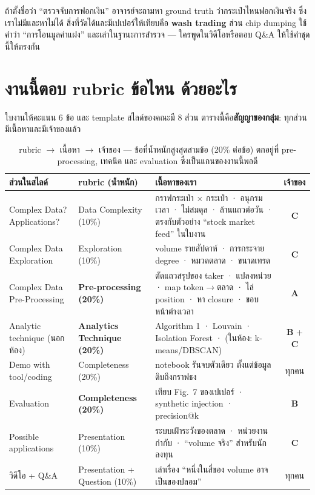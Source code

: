 \documentclass[11pt,a4paper]{article}
\newcommand{\sansall}{\sffamily}
\newcommand{\en}[1]{#1}
\newcommand{\stg}[2]{\textcolor{#1}{\textbf{\en{#2}}}}
\newcommand{\rA}{\stg{accent}{A}}
\newcommand{\rB}{\stg{alg}{B}}
\newcommand{\rC}{\stg{ext}{C}}
\newcommand{\thd}[1]{\sansall\bfseries #1}
\begin{document}
\begin{warnbox}[title={ทำไมชื่อหัวข้อไม่ใช้คำว่า ``ฟอกเงิน'' ตรง ๆ}]
ถ้าตั้งชื่อว่า ``ตรวจจับการฟอกเงิน'' อาจารย์จะถามหา ground truth ว่ากระเป๋าไหนฟอกเงินจริง
ซึ่งเราไม่มีและหาไม่ได้ สิ่งที่วัดได้และมีเปเปอร์ให้เทียบคือ \textbf{wash trading}
ส่วน chip dumping ใช้คำว่า ``การโอนมูลค่าแฝง'' และเล่าในฐานะการสำรวจ
--- ใครพูดในวิดีโอหรือตอบ Q\&A ให้ใช้คำชุดนี้ให้ตรงกัน
\end{warnbox}

\section{งานนี้ตอบ rubric ข้อไหน ด้วยอะไร}

ใบงานให้คะแนน 6 ข้อ และ template สไลด์ของคณะมี 8 ส่วน
ตารางนี้คือ\textbf{สัญญาของกลุ่ม}: ทุกส่วนมีเนื้อหาและมีเจ้าของแล้ว

\begin{table}[H]
\centering\small
\begin{tabular}{L{3.3cm}L{2.4cm}L{7.4cm}c}
\toprule
\thd{ส่วนในสไลด์} & \thd{rubric (น้ำหนัก)} & \thd{เนื้อหาของเรา} & \thd{เจ้าของ} \\
\midrule
Complex Data? Applications? & Data Complexity (10\%) &
  กราฟกระเป๋า × กระเป๋า · อนุกรมเวลา · ไม่สมดุล · ล้านแถวต่อวัน ·
  ตรงกับตัวอย่าง ``stock market feed'' ในใบงาน & \rC \\
\addlinespace
Complex Data Exploration & Exploration (10\%) &
  volume รายสัปดาห์ · การกระจาย degree · หมวดตลาด · ขนาดเทรด & \rC \\
\addlinespace
Complex Data Pre-Processing & \textbf{Pre-processing (20\%)} &
  ตัดแถวสรุปของ taker · แปลงหน่วย · map token\ensuremath{\to}ตลาด · ไล่ position ·
  หา closure · ขอบหน้าต่างเวลา & \rA \\
\addlinespace
Analytic technique (นอกห้อง) & \textbf{Analytics Technique (20\%)} &
  Algorithm 1 · Louvain · Isolation Forest · (ในห้อง: k-means/DBSCAN) & \rB{} + \rC \\
\addlinespace
Demo with tool/coding & Completeness (20\%) &
  notebook รันจบตัวเดียว ตั้งแต่ข้อมูลดิบถึงกราฟธง & ทุกคน \\
\addlinespace
Evaluation & \textbf{Completeness (20\%)} &
  เทียบ Fig.~7 ของเปเปอร์ · synthetic injection · precision@k & \rB \\
\addlinespace
Possible applications & Presentation (10\%) &
  ระบบเฝ้าระวังของตลาด · หน่วยงานกำกับ · ``volume จริง'' สำหรับนักลงทุน & \rC \\
\addlinespace
วิดีโอ + Q\&A & Presentation + Question (10\%) &
  เล่าเรื่อง ``หนึ่งในสี่ของ volume อาจเป็นของปลอม'' & ทุกคน \\
\bottomrule
\end{tabular}
\caption{rubric \ensuremath{\to} เนื้อหา \ensuremath{\to} เจ้าของ --- ข้อที่น้ำหนักสูงสุดสามข้อ (20\% ต่อข้อ)
ตกอยู่ที่ pre-processing, เทคนิค และ evaluation ซึ่งเป็นแกนของงานนี้พอดี}
\end{table}
\end{document}
